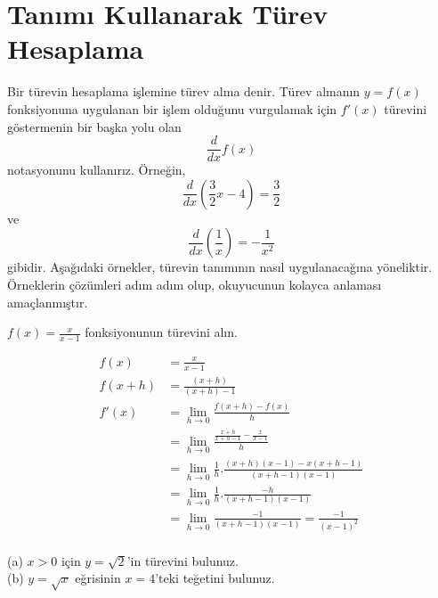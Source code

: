 \section{\protect Tanımı Kullanarak Türev Hesaplama}\label{bolumetiketi}
Bir türevin hesaplama işlemine türev alma denir. Türev almanın $y = f(x)$ fonksiyonuna uygulanan bir işlem olduğunu vurgulamak için $f'(x)$ türevini göstermenin bir başka yolu olan
\begin{equation*}
	 \frac{d}{dx}f(x)
\end{equation*}
notasyonunu kullanırız. Örneğin,
\begin{equation*}
	 \frac{d}{dx}\left(\frac{3}{2}x-4\right) = \frac{3}{2}
\end{equation*}
ve
\begin{equation*}
	 \frac{d}{dx}\left(\frac{1}{x}\right) = -\frac{1}{x^2}
\end{equation*}
gibidir. Aşağıdaki örnekler, türevin tanımının nasıl uygulanacağına yöneliktir. Örneklerin çözümleri adım adım olup, okuyucunun kolayca anlaması amaçlanmıştır.
\begin{ornek}
$f(x) = \frac{x}{x-1}$ fonksiyonunun türevini alın.
\end{ornek}
\begin{cozum}
	\begin{equation*}
	\begin{split}
		f(x)  &=\frac{x}{x-1}\\
		f(x+h)  &=\frac{(x+h)}{(x+h)-1}\\
		f'(x) & =\lim_{h \rightarrow 0}\frac{f(x+h)-f(x)}{h}\\
		& = \lim_{h \rightarrow 0}\frac{\frac{x+h}{x+h-1}-\frac{x}{x-1}}{h}\\
		& = \lim_{h \rightarrow 0}\frac{1}{h}.\frac{(x+h)(x-1)-x(x+h-1)}{(x+h-1)(x-1)}\\
		& = \lim_{h \rightarrow 0}\frac{1}{h}.\frac{-h}{(x+h-1)(x-1)}\\
		& = \lim_{h \rightarrow 0}\frac{-1}{(x+h-1)(x-1)}=\frac{-1}{(x-1)^2}\\
	\end{split}
\end{equation*}
\end{cozum}
\begin{ornek}
(a) $x>0$ için $y=\sqrt{2}$'in türevini bulunuz.\\
(b) $y=\sqrt{x}$ eğrisinin $x=4$'teki teğetini bulunuz.
\end{ornek}
